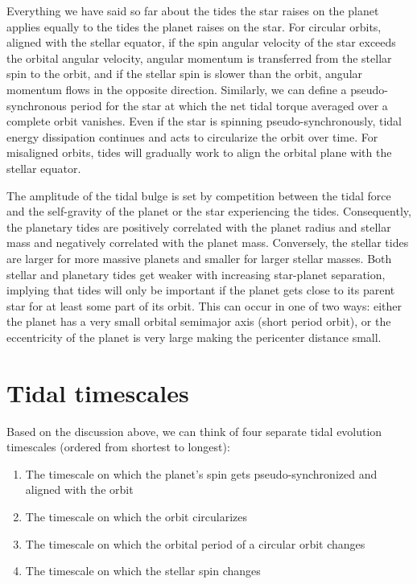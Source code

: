 Everything we have said so far about the tides the star raises on the planet
applies equally to the tides the planet raises on the star. For circular orbits,
aligned with the stellar equator, if the spin angular velocity of the star
exceeds the orbital angular velocity, angular momentum is transferred from the
stellar spin to the orbit, and if the stellar spin is slower than the orbit,
angular momentum flows in the opposite direction. Similarly, we can define a
pseudo-synchronous period for the star at which the net tidal torque averaged
over a complete orbit vanishes. Even if the star is spinning
pseudo-synchronously, tidal energy dissipation continues and acts to circularize
the orbit over time. For misaligned orbits, tides will gradually work to align
the orbital plane with the stellar equator.

The amplitude of the tidal bulge is set by competition between the tidal force
and the self-gravity of the planet or the star experiencing the tides.
Consequently, the planetary tides are positively correlated with the planet
radius and stellar mass and negatively correlated with the planet mass.
Conversely, the stellar tides are larger for more massive planets and smaller
for larger stellar masses. Both stellar and planetary tides get weaker with
increasing star-planet separation, implying that tides will only be important if
the planet gets close to its parent star for at least some part of its orbit.
This can occur in one of two ways: either the planet has a very small orbital
semimajor axis (short period orbit), or the eccentricity of the planet is very
large making the pericenter distance small.

\section{Tidal timescales}

Based on the discussion above, we can think of four separate tidal evolution
timescales (ordered from shortest to longest):

\begin{enumerate}
%
    \item The timescale on which the planet's spin gets pseudo-synchronized and
        aligned with the orbit
%
    \item The timescale on which the orbit circularizes
%
    \item The timescale on which the orbital period of a circular orbit changes
%
    \item The timescale on which the stellar spin changes
%
\end{enumerate}


